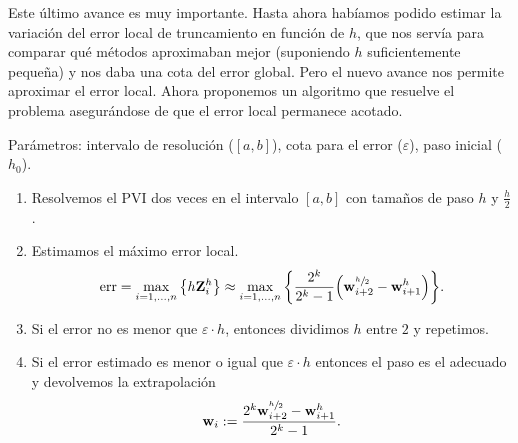 
Este último avance es muy importante.
Hasta ahora habíamos podido estimar
la variación del error local de truncamiento en función de $h$,
que nos servía para comparar qué métodos aproximaban mejor
(suponiendo $h$ suficientemente pequeña)
y nos daba una cota del error global.
Pero el nuevo avance nos permite aproximar el error local.
Ahora proponemos un algoritmo que resuelve el problema
asegurándose de que el error local permanece acotado.

\begin{definition}
    Parámetros:
    intervalo de resolución (\/$[a, b]$),
    cota para el error (\/$\varepsilon$),
    paso inicial (\/$h_0$).

    \begin{enumerate}
        \item Resolvemos el PVI dos veces en el intervalo $[a, b]$
        con tamaños de paso $h$ y $\frac{h}{2}$.
        \item Estimamos el máximo error local.
        \begin{equation*}
            \operatorname{err} = \max_{i = 1,\ldots,n}\qty{h\vb{Z}{}^h_i} \approx
            \max_{i = 1,\ldots,n}\qty{
                \frac{2^k}{2^k-1}\qty(\vb{w}{}^{\sfrac{h}{2}}_{i+2} - \vb{w}{}^h_{i+1})
            }.
        \end{equation*}
        \item Si el error no es menor que $\varepsilon\cdot h$,
        entonces dividimos $h$ entre $2$ y repetimos.
        \item Si el error estimado es menor o igual que $\varepsilon \cdot h$
        entonces el paso es el adecuado y
        devolvemos la extrapolación
        \begin{equation*}
            \vb{w}{}_i := \frac{2^k\vb{w}{}^{\sfrac{h}{2}}_{i+2} - \vb{w}{}^h_{i+1}}{2^k - 1}.
        \end{equation*}
    \end{enumerate}
\end{definition}

